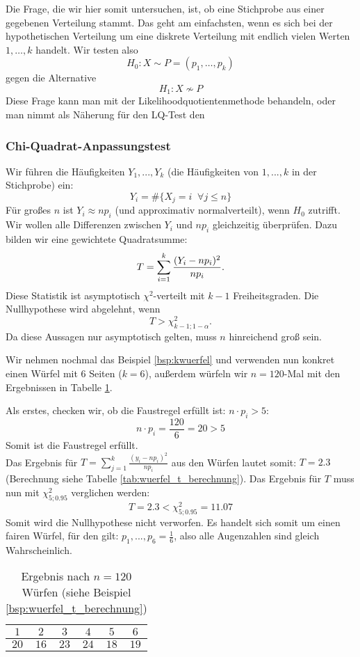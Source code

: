 Die Frage, die wir hier somit untersuchen, ist, ob eine Stichprobe aus einer
gegebenen Verteilung stammt. Das geht am einfachsten, wenn es sich
bei der hypothetischen Verteilung um eine diskrete Verteilung mit
endlich vielen Werten $1,\dots,k$ handelt. 
Wir testen also 
\[H_0:X\sim P=(p_1,\dots,p_k)\]
gegen die Alternative 
\[H_1:X\not\sim P\]
Diese Frage kann man mit der Likelihoodquotientenmethode behandeln, oder man nimmt als Näherung für den LQ-Test den 
\subsubsection{Chi-Quadrat-Anpassungstest}

Wir führen die Häufigkeiten $Y_1,...,Y_k$ (die Häufigkeiten von $1,...,k$ in der Stichprobe) ein:
\[Y_i=\#\{X_j=i\;\;\forall j\le n\}\]
Für großes $n$ ist $Y_i\approx np_i$ (und approximativ normalverteilt),
wenn $H_0$ zutrifft. Wir wollen alle Differenzen zwischen $Y_i$ und $np_i$
gleichzeitig überprüfen. Dazu bilden wir eine gewichtete Quadratsumme:
\[T=\sum_{i=1}^k{(Y_i-np_i)^2\over np_i}.\]
Diese Statistik ist asymptotisch $\chi^2$-verteilt mit $k-1$ Freiheitsgraden.
Die Nullhypothese wird abgelehnt, wenn
\[T>\chi^2_{k-1;1-\alpha}.\]
Da diese Aussagen nur asymptotisch gelten, muss $n$ hinreichend groß sein. 

\begin{bsp}\label{bsp:wuerfel_t_berechnung}
Wir nehmen nochmal das Beispiel \ref{bsp:kwuerfel} und verwenden nun konkret einen Würfel mit 6 Seiten ($k=6$), außerdem würfeln wir $n=120$-Mal mit den Ergebnissen in Tabelle \ref{tab:wuerfe}.

Als erstes, checken wir, ob die Faustregel erfüllt ist: $n\cdot p_i>5$:\[n\cdot p_i=\frac{120}{6}=20>5\]
Somit ist die Faustregel erfüllt.\\

Das Ergebnis für $T=\sum_{j=1}^k\frac{(y_i-np_i)^2}{np_i}$ aus den Würfen lautet somit: $T=2.3$ (Berechnung siehe Tabelle \ref{tab:wuerfel_t_berechnung}).
Das Ergebnis für $T$ muss nun mit $\chi_{5;0.95}^2$ verglichen werden:
\[T=2.3<\chi_{5;0.95}^2=11.07\]
Somit wird die Nullhypothese nicht verworfen. Es handelt sich somit um einen fairen Würfel, für den gilt:
${p_1,...,p_6=\frac{1}{6}}$, also alle Augenzahlen sind gleich Wahrscheinlich.
\end{bsp}
\begin{table}
    \centering
    \begin{tabular}{|c|c|c|c|c|c|}
        \hline
        $1$ & $2$ & $3$ & $4$ & $5$ & $6$ \\
        \hline
        $20$ & $16$ & $23$ & $24$ & $18$ & $19$\\
        \hline
    \end{tabular}
    \caption{Ergebnis nach $n=120$ Würfen (siehe Beispiel \ref{bsp:wuerfel_t_berechnung})}\label{tab:wuerfe}
\end{table}

